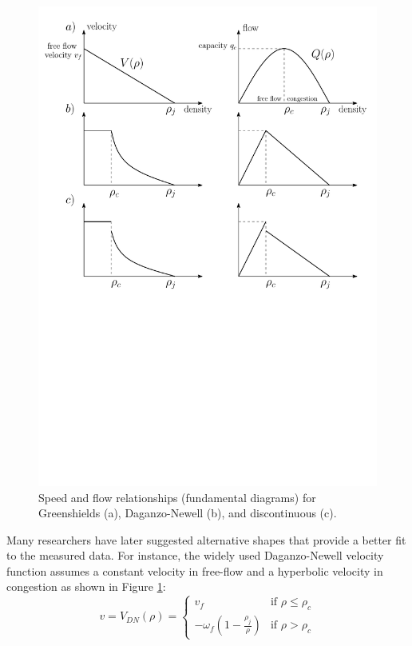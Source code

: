 \documentclass[11pt]{article}
\numberwithin{equation}{section}
\numberwithin{figure}{section}
\numberwithin{table}{section}
\begin{document}
\begin{figure}[ht]
  \centering
    \includegraphics[width=12cm]{fundamentalDiagram2.pdf}
    \caption{Speed and flow relationships (fundamental diagrams) for Greenshields (a), Daganzo-Newell (b), and discontinuous (c).}
    \label{fig:fundamentalDiagram}
\end{figure}

Many researchers have later suggested alternative shapes that provide a better fit to the measured data. For instance, the widely used Daganzo-Newell velocity function assumes a constant velocity in free-flow and a hyperbolic velocity in congestion as shown in Figure \ref{fig:fundamentalDiagram}:
\noindent 
\begin{equation}\label{eq:dnVelocity}
v = V_{DN}(\rho) = \begin{cases}
v_{f} & \text{if } \rho \leq \rho_{c} \\
-\omega_{f} \left( 1 - \frac{\rho_{j}}{\rho} \right) & \text{if } \rho > \rho_{c}
\end{cases}
\end{equation}
\end{document}

